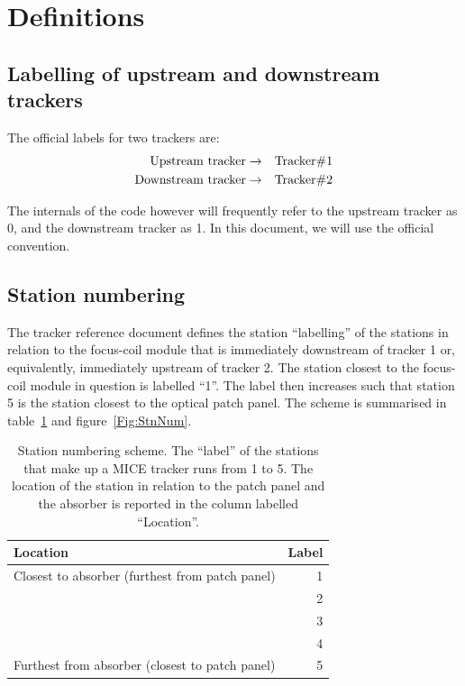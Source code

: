 \section{Definitions}
\label{Sect:Definitions}

\subsection{Labelling of upstream and downstream trackers}
\label{SubSect:TkrLabel}

The official labels for two trackers are: 
\begin{eqnarray}
  {\rm Upstream~tracker}   & \rightarrow & {\rm Tracker \# 1} \nonumber \\
  {\rm Downstream~tracker} & \rightarrow & {\rm Tracker \# 2} \nonumber 
\end{eqnarray}

The internals of the code however will frequently refer to the upstream tracker as 0, and the downstream tracker as 1. In this document, we will use the official convention.

\subsection{Station numbering}
\label{SubSect:StnNumbering}

The tracker reference document defines the station ``labelling'' of the stations in relation to the focus-coil module that is immediately downstream of tracker 1 or, equivalently, immediately upstream of tracker 2.  The station closest to the focus-coil module in question is labelled  ``1''.  The label then increases such that station 5 is the station
closest to the optical patch panel. The scheme is summarised in table~\ref{Tab:StnNum} and figure~\ref{Fig:StnNum}.

\begin{table}[hb]
  \caption{Station numbering scheme. The ``label'' of the stations that make up a MICE tracker runs from 1 to 5. The location of the station in relation to the patch panel and the absorber is reported in the column labelled ``Location''.}
  \label{Tab:StnNum}
  \begin{tabular}{|l|r|}
    \hline
    {\bf Location}                                  & {\bf Label} \\
    \hline
    Closest to absorber (furthest from patch panel) &           1 \\
                                                    &           2 \\ 
                                                    &           3 \\
                                                    &           4 \\
    Furthest from absorber (closest to patch panel) &           5 \\
    \hline
  \end{tabular}
\end{table}

